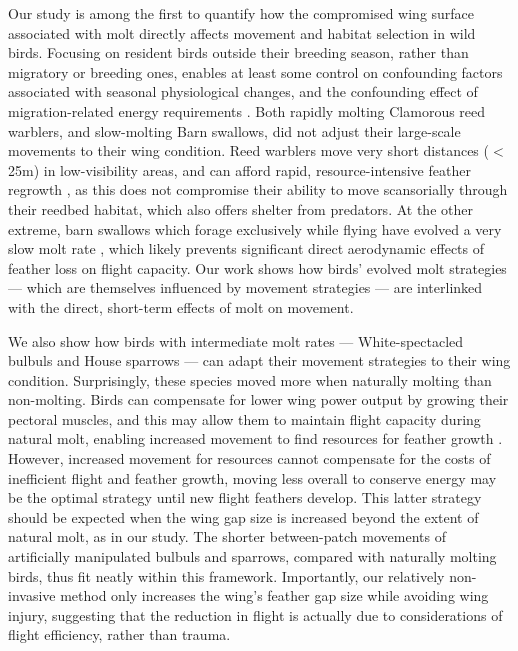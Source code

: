 \begin{refsection}
Our study is among the first to quantify how the compromised wing surface associated with molt directly affects movement and habitat selection in wild birds.
Focusing on resident birds outside their breeding season, rather than migratory or breeding ones, enables at least some control on confounding factors associated with seasonal physiological changes, and the confounding effect of migration-related energy requirements \cite{alerstam1990,wikelski2003,horvitz2014}.
Both rapidly molting Clamorous reed warblers, and slow-molting Barn swallows, did not adjust their large-scale movements to their wing condition.
Reed warblers move very short distances ($<$ 25m) in low-visibility areas, and can afford rapid, resource-intensive feather regrowth \citep{lindstrom1993,newton2009,kiat2017}, as this does not compromise their ability to move scansorially through their reedbed habitat, which also offers shelter from predators.
At the other extreme, barn swallows which forage exclusively while flying have evolved a very slow molt rate \cite{kiat2016}, which likely prevents significant direct aerodynamic effects of feather loss on flight capacity.
Our work shows how birds' evolved molt strategies --- which are themselves influenced by movement strategies \cite{kiat2016} --- are interlinked with the direct, short-term effects of molt on movement.

We also show how birds with intermediate molt rates --- White-spectacled bulbuls and House sparrows --- can adapt their movement strategies to their wing condition.
Surprisingly, these species moved more when naturally molting than non-molting.
Birds can compensate for lower wing power output by growing their pectoral muscles, and this may allow them to maintain flight capacity during natural molt, enabling increased movement to find resources for feather growth \cite{chai1997,swaddle1997}.
However, increased movement for resources cannot compensate for the costs of inefficient flight and feather growth, moving less overall to conserve energy may be the optimal strategy until new flight feathers develop.
This latter strategy should be expected when the wing gap size is increased beyond the extent of natural molt, as in our study.
The shorter between-patch movements of artificially manipulated bulbuls and sparrows, compared with naturally molting birds, thus fit neatly within this framework.
Importantly, our relatively non-invasive method only increases the wing's feather gap size while avoiding wing injury, suggesting that the reduction in flight is actually due to considerations of flight efficiency, rather than trauma.


\end{refsection}
